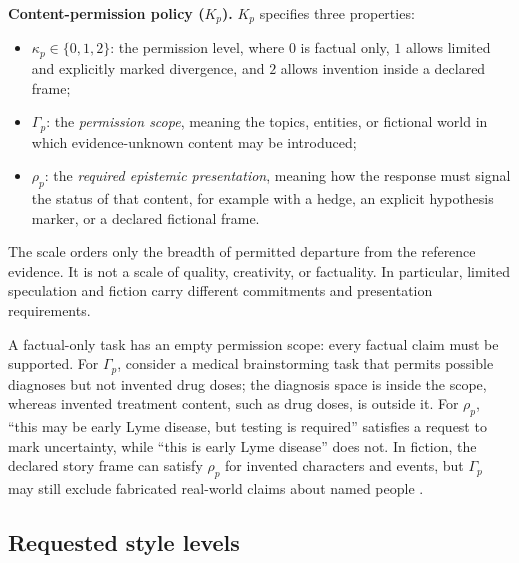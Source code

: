 \documentclass{clv2025}
\begin{document}
\textbf{Content-permission policy ($K_p$).}
$K_p$ specifies three properties:
\begin{itemize}
  \item $\kappa_p\in\{0,1,2\}$: the permission level, where $0$ is factual only, $1$ allows limited and explicitly marked divergence, and $2$ allows invention inside a declared frame;
  \item $\Gamma_p$: the \emph{permission scope}, meaning the topics, entities, or fictional world in which evidence-unknown content may be introduced;
  \item $\rho_p$: the \emph{required epistemic presentation}, meaning how the response must signal the status of that content, for example with a hedge, an explicit hypothesis marker, or a declared fictional frame.
\end{itemize}
The scale orders only the breadth of permitted departure from the reference evidence.
It is not a scale of quality, creativity, or factuality.
In particular, limited speculation and fiction carry different commitments and presentation requirements.

A factual-only task has an empty permission scope: every factual claim must be supported.
For $\Gamma_p$, consider a medical brainstorming task that permits possible diagnoses but not invented drug doses; the diagnosis space is inside the scope, whereas invented treatment content, such as drug doses, is outside it.
For $\rho_p$, ``this may be early Lyme disease, but testing is required'' satisfies a request to mark uncertainty, while ``this is early Lyme disease'' does not.
In fiction, the declared story frame can satisfy $\rho_p$ for invented characters and events, but $\Gamma_p$ may still exclude fabricated real-world claims about named people \citep{searle_logical_1975}.

\subsection{Requested style levels}
\end{document}
